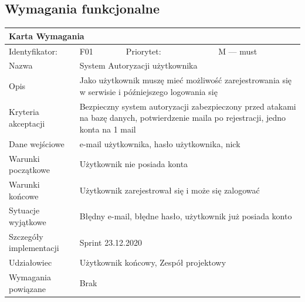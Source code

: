 \documentclass[a4paper,11pt]{report}
\begin{document}
	\subsection {Wymagania funkcjonalne}
		\begin{tabular}{|p{3cm}|p{2cm}|p{2cm}|p{6cm}|}
		\hline
		\multicolumn{4}{|p{12 cm}|}{Karta Wymagania}\\
		\hline
		Identyfikator: & F01 & Priorytet: & M — must\\
		\hline
		Nazwa & \multicolumn{3}{|p{10 cm}|}{System Autoryzacji użytkownika}\\
		\hline
		Opis & \multicolumn{3}{|p{10 cm}|}{Jako użytkownik muszę mieć możliwość zarejestrowania się w serwisie i późniejszego logowania się}\\
		\hline
		Kryteria akceptacji & \multicolumn{3}{|p{10 cm}|}{Bezpieczny system autoryzacji zabezpieczony przed atakami na bazę danych, potwierdzenie maila po rejestracji,  jedno konta na 1 mail}\\
		\hline
		Dane wejściowe & \multicolumn{3}{|p{10 cm}|}{e-mail użytkownika, hasło użytkownika, nick}\\
		\hline
		Warunki początkowe & \multicolumn{3}{|p{10 cm}|}{Użytkownik nie posiada konta}\\
		\hline
		Warunki końcowe & \multicolumn{3}{|p{10 cm}|}{Użytkownik zarejestrował się i może się zalogować}\\
		\hline
		Sytuacje wyjątkowe & \multicolumn{3}{|p{10 cm}|}{Błędny e-mail, błędne hasło, użytkownik już posiada konto}\\
		\hline
		Szczegóły implementacji & \multicolumn{3}{|p{10 cm}|}{Sprint 23.12.2020}\\
		\hline
		Udziałowiec & \multicolumn{3}{|p{10 cm}|}{Użytkownik końcowy, Zespół projektowy}\\
		\hline
		Wymagania powiązane & \multicolumn{3}{|p{10 cm}|}{Brak}\\
		\hline
		\end{tabular}\\
		\newline
		\vspace*{0,2 cm}
		\newline
\end{document}
